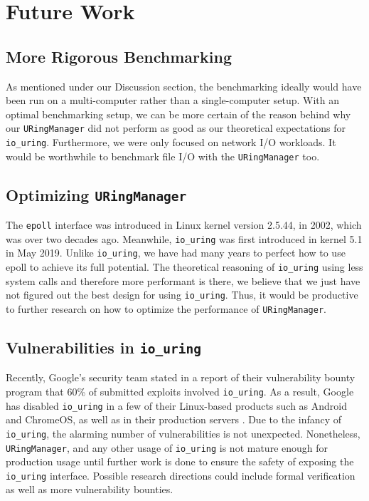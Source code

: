\chapter{Future Work}

\section{More Rigorous Benchmarking} 
As mentioned under our Discussion section, the benchmarking ideally would have been run on a multi-computer rather than a single-computer setup. With an optimal benchmarking setup, we can be more certain of the reason behind why our \texttt{URingManager} did not perform as good as our theoretical expectations for \texttt{io\_uring}. Furthermore, we were only focused on network I/O workloads. It would be worthwhile to benchmark file I/O with the \texttt{URingManager} too.

\section{Optimizing \texttt{URingManager}}
The \texttt{epoll} interface was introduced in Linux kernel version 2.5.44, in 2002,
which was over two decades ago. Meanwhile, \texttt{io\_uring} was first introduced in kernel 5.1 in May 2019. Unlike \texttt{io\_uring}, we have had many years to perfect how to use epoll to achieve its full potential. The theoretical reasoning of \texttt{io\_uring} using less system calls and therefore more performant is there, we believe that we just have not figured out the best design for using \texttt{io\_uring}. Thus, it would be  productive to further research on how to optimize the performance of \texttt{URingManager}.

\section{Vulnerabilities in \texttt{io\_uring}} 
Recently, Google’s security team stated in a report of their vulnerability bounty program that 60\% of submitted exploits involved \texttt{io\_uring}. As a result, Google has disabled \texttt{io\_uring} in a few of their Linux-based products such as Android and ChromeOS, as well as in their production servers \cite{google_security}. Due to the infancy of \texttt{io\_uring}, the alarming number of vulnerabilities is not unexpected. Nonetheless, \texttt{URingManager}, and any other usage of \texttt{io\_uring} is not mature enough for production usage until further work is done to ensure the safety of exposing the \texttt{io\_uring} interface. Possible research directions could include formal verification as well as more vulnerability bounties.

